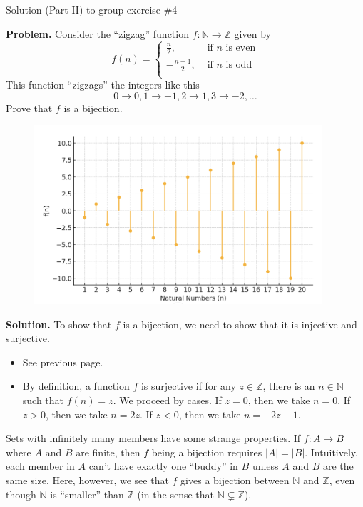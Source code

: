 \documentclass[10pt]{beamer}
\begin{document}
\begin{frame}{Solution (Part II) to group exercise \#4}
\scriptsize 
\begin{minipage}{0.5\textwidth}
\textbf{Problem.}  Consider the \enquote{zigzag} function $f: \mathbb{N} \to \mathbb{Z}$ given by 
	\[ f(n) = 
	\begin{cases}
	\frac{n}{2}, & \text{ if $n$ is even} \\
	-\frac{n+1}{2}, & \text{ if $n$ is odd} \\
	\end{cases}
	\]
	This function \enquote{zigzags} the integers like this
	\[ 0 \to 0, 1 \to -1, 2 \to 1, 3 \to -2, \hdots \]
	Prove that $f$ is a bijection.	
\end{minipage}
\hfill 
\begin{minipage}{0.48\textwidth}
\begin{figure}
\includegraphics[width=0.95\textwidth]{images/zig_zag_function.png}	
\end{figure}
\end{minipage}
\vfill 
\textbf{Solution.}
To show that $f$ is a bijection, we need to show that it is injective and surjective.
		\begin{itemize} \scriptsize 
		\item {} See previous page.
		\item {}  By definition, a function $f$ is surjective if for any $z \in \mathbb{Z}$, there is an $n \in \mathbb{N}$ such that $f(n)=z$.  We proceed by cases.  If $z=0$, then we take $n=0$.  If $z>0$, then we take $n=2z$.  If $z<0$, then we take $n=-2z-1$.
		\end{itemize} 
\vfill 

\begin{myredbox}[title=Remark: The strangeness of infinity]
Sets with infinitely many members have some strange properties. If $f: A \to B$ where $A$ and $B$ are finite, then $f$ being a bijection requires $|A|=|B|$.  Intuitively, each member in $A$ can't have exactly one \enquote{buddy} in $B$  unless $A$ and $B$ are the same size.  Here, however, we see that $f$ gives a bijection between $\mathbb{N}$ and $\mathbb{Z}$, even though  $\mathbb{N}$ is \enquote{smaller} than $\mathbb{Z}$ (in the sense that $\mathbb{N} \subsetneq \mathbb{Z}$).
\end{myredbox}

\end{frame}
\end{document}

